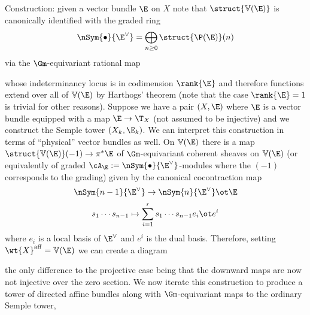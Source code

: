 \documentclass[12pt]{article}
\newcommand{\V}{\mathbb{V}}
\begin{document}
Construction: given a vector bundle $\E$ on $X$ note that $\struct{\V(\E)}$ is canonically identified with the graded ring
\[ \nSym{\bullet}{\E^\vee} = \bigoplus_{n \ge 0} \struct{\P(\E)}(n) \]
via the $\Gm$-equivariant rational map
\begin{center}
\end{center}
whose indeterminancy locus is in codimension $\rank{\E}$ and therefore functions extend over all of $\V(\E)$ by Harthogs' theorem (note that the case $\rank{\E} = 1$ is trivial for other reasons). Suppose we have a pair $(X, \E)$ where $\E$ is a vector bundle equipped with a map $\E \to \T_X$ (not assumed to be injective) and we construct the Semple tower $(X_k, \E_k)$. We can interpret this construction in terms of ``physical'' vector bundles as well. On $\V(\E)$ there is a map $\struct{\V(\E)}(-1) \to \pi^* \E$ of $\Gm$-equivariant coherent sheaves on $\V(\E)$ (or equivalently of graded $\cA_\E := \nSym{\bullet}{\E^\vee}$-modules where the $(-1)$ corresponds to the grading) given by the canonical cocontraction map
\[ \nSym{n-1}{\E^\vee} \to \nSym{n}{\E^\vee} \ot \E \] 
\[ s_1 \cdots s_{n-1} \mapsto \sum_{i = 1}^r s_1 \cdots s_{n-1} e_i \ot e^i \]
where $e_i$ is a local basis of $\E^\vee$ and $e^i$ is the dual basis. Therefore, setting $\wt{X}^{\aff} = \V(\E)$ we can create a diagram
\begin{center}
\end{center}
the only difference to the projective case being that the downward maps are now not injective over the zero section. We now iterate this construction to produce a tower of directed affine bundles along with $\Gm$-equivariant maps to the ordinary Semple tower,
\begin{center}
\end{center}
\end{document}
